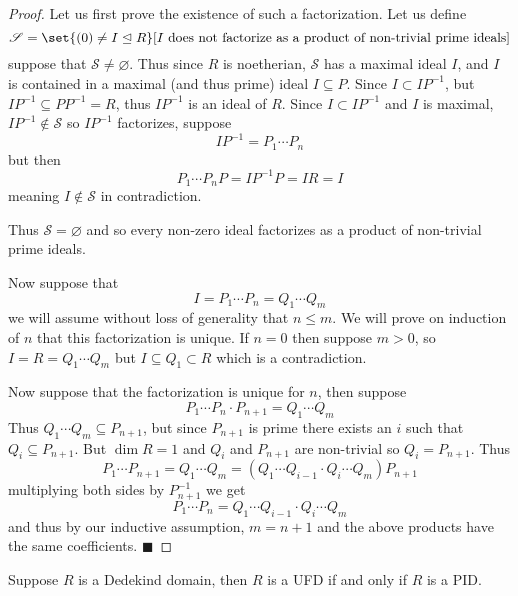 \documentclass[10pt]{article}
\let\ideal=\trianglelefteq
\def\qed{%
    \ifmmode%
        \eqno\blacksquare%
    \else%
        \hskip1cm\allowbreak\hbox{}\nobreak\hfill$\blacksquare$%
    \fi%
}
\def\sS{\mathscr S}
\begin{document}
\begin{proof}

    Let us first prove the existence of such a factorization.
    Let us define
    \[ \sS = \set{(0)\neq I\ideal R}[I\text{ does not factorize as a product of non-trivial prime ideals}] \]
    suppose that $\sS\neq\varnothing$.
    Thus since $R$ is noetherian, $\sS$ has a maximal ideal $I$, and $I$ is contained in a maximal (and thus prime) ideal $I\subseteq P$.
    Since $I\subset IP^{-1}$, but $IP^{-1}\subseteq PP^{-1}=R$, thus $IP^{-1}$ is an ideal of $R$.
    Since $I\subset IP^{-1}$ and $I$ is maximal, $IP^{-1}\notin\sS$ so $IP^{-1}$ factorizes, suppose
    \[ IP^{-1} = P_1\cdots P_n \]
    but then
    \[ P_1\cdots P_nP = IP^{-1}P = IR = I \]
    meaning $I\notin\sS$ in contradiction.

    Thus $\sS=\varnothing$ and so every non-zero ideal factorizes as a product of non-trivial prime ideals.

    Now suppose that
    \[ I = P_1\cdots P_n = Q_1\cdots Q_m \]
    we will assume without loss of generality that $n\leq m$.
    We will prove on induction of $n$ that this factorization is unique.
    If $n=0$ then suppose $m>0$, so $I=R=Q_1\cdots Q_m$ but $I\subseteq Q_1\subset R$ which is a contradiction.

    Now suppose that the factorization is unique for $n$, then suppose
    \[ P_1\cdots P_n\cdot P_{n+1} = Q_1\cdots Q_m \]
    Thus $Q_1\cdots Q_m\subseteq P_{n+1}$, but since $P_{n+1}$ is prime there exists an $i$ such that $Q_i\subseteq P_{n+1}$.
    But $\dim R=1$ and $Q_i$ and $P_{n+1}$ are non-trivial so $Q_i=P_{n+1}$.
    Thus
    \[ P_1\cdots P_{n+1} = Q_1\cdots Q_m = (Q_1\cdots Q_{i-1}\cdot Q_i\cdots Q_m)P_{n+1} \]
    multiplying both sides by $P^{-1}_{n+1}$ we get
    \[ P_1\cdots P_n = Q_1\cdots Q_{i-1}\cdot Q_i\cdots Q_m \]
    and thus by our inductive assumption, $m=n+1$ and the above products have the same coefficients.
    \qed

\end{proof}

\begin{prop*}

    Suppose $R$ is a Dedekind domain, then $R$ is a UFD if and only if $R$ is a PID.

\end{prop*}
\end{document}
